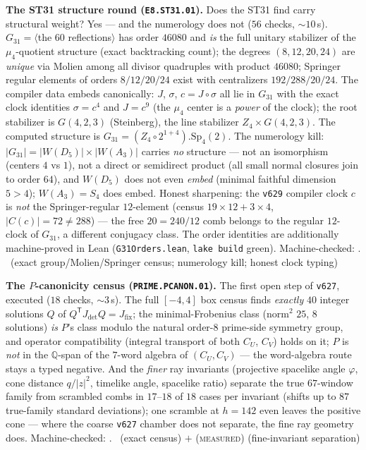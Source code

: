 \documentclass[11pt,a4paper]{article}
\theoremstyle{definition}
\begin{document}
\par\smallskip\noindent\textbf{The ST31 structure round
(\texttt{E8.ST31.01}).}
Does the ST31 find carry structural weight?  Yes --- and the
numerology does not ($56$ checks, ${\sim}10$\,s).  $G_{31}=\langle$the
$60$ reflections$\rangle$ has order $46080$ and \emph{is} the full
unitary stabilizer of the $\mu_4$-quotient structure (exact
backtracking count); the degrees $(8,12,20,24)$ are \emph{unique} via
Molien among all divisor quadruples with product $46080$; Springer
regular elements of orders $8/12/20/24$ exist with centralizers
$192/288/20/24$.  The compiler data embeds canonically: $J$, $\sigma$,
$c=J\circ\sigma$ all lie in $G_{31}$ with the exact clock identities
$\sigma=c^4$ and $J=c^9$ (the $\mu_4$ center is a \emph{power} of the
clock); the root stabilizer is $G(4,2,3)$ (Steinberg), the line
stabilizer $Z_4\times G(4,2,3)$.  The computed structure is
$G_{31}=(Z_4\circ2^{1+4}).\mathrm{Sp}_4(2)$.  The numerology kill:
$|G_{31}|=|W(D_5)|\times|W(A_3)|$ carries \emph{no} structure ---
not an isomorphism (centers $4$ vs $1$), not a direct or semidirect
product (all small normal closures join to order $64$), and $W(D_5)$
does not even \emph{embed} (minimal faithful dimension $5>4$);
$W(A_3)=S_4$ does embed.  Honest sharpening: the \texttt{v629}
compiler clock $c$ is \emph{not} the Springer-regular $12$-element
(census $19\times12+3\times4$, $|C(c)|=72\ne288$) --- the free
$20=240/12$ comb belongs to the regular $12$-clock of $G_{31}$, a
different conjugacy class.  The order identities are additionally
machine-proved in Lean (\texttt{G31Orders.lean}, \texttt{lake build}
green).
Machine-checked: .
\mE\ (exact group/Molien/Springer census; numerology kill; honest
clock typing)
\par\smallskip

\par\smallskip\noindent\textbf{The $P$-canonicity census
(\texttt{PRIME.PCANON.01}).}
The first open step of \texttt{v627}, executed ($18$ checks,
${\sim}3$\,s).  The full $[-4,4]$ box census finds \emph{exactly} $40$
integer solutions $Q$ of $Q^{\mathsf T}J_{\mathrm{det}}Q=
J_{\mathrm{fix}}$; the minimal-Frobenius class (norm$^2$ $25$, $8$
solutions) \emph{is} $P$'s class modulo the natural order-$8$
prime-side symmetry group, and operator compatibility (integral
transport of both $C_U$, $C_V$) holds on it; $P$ is \emph{not} in the
$\mathbb Q$-span of the $7$-word algebra of $(C_U,C_V)$ --- the
word-algebra route stays a typed negative.  And the \emph{finer} ray
invariants (projective spacelike angle $\varphi$, cone distance
$q/|z|^2$, timelike angle, spacelike ratio) separate the true
$67$-window family from scrambled combs in $17$--$18$ of $18$ cases
per invariant (shifts up to $87$ true-family standard deviations); one
scramble at $h=142$ even leaves the positive cone --- where the coarse
\texttt{v627} chamber does not separate, the fine ray geometry does.
Machine-checked: .
\mE\ (exact census) $+$ (\textsc{measured}) (fine-invariant
separation)
\par\smallskip
\end{document}
